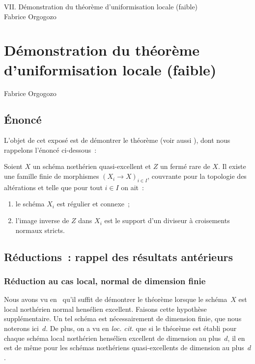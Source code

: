 \documentclass[10pt]{smfart}
\begin{document}
\begin{center}
VII. Démonstration du théorème d'uniformisation locale (faible)\\
Fabrice Orgogozo
\end{center}
\version

\else
{}
\chapter{Démonstration du théorème d'uniformisation
locale (faible)}
\begin{center}
Fabrice Orgogozo
\end{center}
\fi

\section{Énoncé}

L'objet de cet exposé est de démontrer le théorème
(voir aussi ),
dont nous rappelons l'énoncé ci-dessous :

\begin{théorème}\label{7-uniformisation}
Soient $X$ un schéma nœthérien quasi-excellent
et $Z$ un fermé rare de $X$.
Il existe une famille finie de morphismes 
$(X_i→X)_{i∈I}$, couvrante pour la topologie des
altérations et telle que pour tout $i∈I$ on ait :
\begin{enumerate}
\item le schéma $X_i$ est régulier et connexe ;
\item l'image inverse de $Z$ dans $X_i$ est le support
d'un diviseur à croisements normaux stricts.
\end{enumerate}
\end{théorème}

\section{Réductions : rappel des résultats antérieurs}\label{7-réductions}

\subsection{Réduction au cas local, normal de dimension finie}
Nous avons vu en 
qu'il suffit de démontrer le théorème lorsque
le schéma $X$ est local nœthérien normal hensélien excellent.
Faisons cette hypothèse supplémentaire. Un tel schéma est nécessairement de dimension finie,
que nous noterons ici $d$. De plus,
on a vu en \emph{loc. cit.} que si le théorème
est établi pour chaque schéma local nœthérien hensélien
excellent de dimension au plus $d$, il en est
de même pour les schémas nœthériens quasi-excellents
de dimension au plus $d$.
\end{document}

